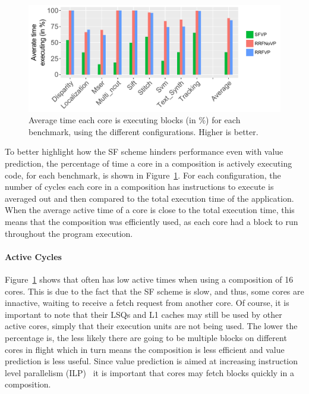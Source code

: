 \begin{figure}[t]
    \centering
    \includegraphics[width=1\textwidth]{chapter3/graphics/perf_av_cycle_exec4.pdf}
    \caption{Average time each core is executing blocks (in \%) for each benchmark, using the different configurations. Higher is better.}
    \label{fig:perf_av_cycle}
	\vspace{1em}
\end{figure}

To better highlight how the SF scheme hinders performance even with value prediction, the percentage of time a core in a composition is actively executing code, for each benchmark, is shown in Figure~\ref{fig:perf_av_cycle}.
For each configuration, the number of cycles each core in a composition has instructions to execute is averaged out and then compared to the total execution time of the application.
When the average active time of a core is close to the total execution time, this means that the composition was efficiently used, as each core had a block to run throughout the program execution.

\paragraph*{Active Cycles}
Figure~\ref{fig:perf_av_cycle} shows that \vp{} often has low active times when using a composition of 16 cores.
This is due to the fact that the SF scheme is slow, and thus, some cores are innactive, waiting to receive a fetch request from another core.
Of course, it is important to note that their LSQs and L1 caches may still be used by other active cores, simply that their execution units are not being used.
The lower the percentage is, the less likely there are going to be multiple blocks on different cores in flight which in turn means the composition is less efficient and value prediction is less useful.
Since value prediction is aimed at increasing instruction level parallelism (ILP)~\cite{peraisBeBop2015} it is important that cores may fetch blocks quickly in a composition.

